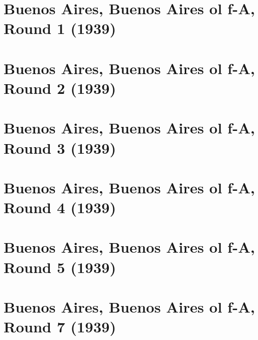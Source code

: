 \documentclass[11pt]{article}
\begin{document}
\clearpage



\clearpage



\clearpage



\clearpage



\clearpage



\clearpage



\clearpage

\section{Buenos Aires, Buenos Aires ol f-A, Round 1 (1939)}


\clearpage

\section{Buenos Aires, Buenos Aires ol f-A, Round 2 (1939)}


\clearpage

\section{Buenos Aires, Buenos Aires ol f-A, Round 3 (1939)}


\clearpage

\section{Buenos Aires, Buenos Aires ol f-A, Round 4 (1939)}


\clearpage

\section{Buenos Aires, Buenos Aires ol f-A, Round 5 (1939)}


\clearpage

\section{Buenos Aires, Buenos Aires ol f-A, Round 7 (1939)}

\end{document}

